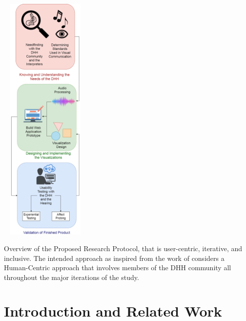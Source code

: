 \documentclass{sigchi-ext}
\begin{document}

\printccsdesc

\begin{marginfigure}[0pc]
\begin{minipage}{\marginparwidth}
     \centering
    \includegraphics[width=4.5cm,height=12.5cm]{figures/newSystemDesignFlowchart.png}
    \caption{Overview of the Proposed Research Protocol, that is user-centric, iterative, and inclusive. The intended approach as inspired from the work of \protect\cite{deja2019myosl} considers a Human-Centric approach that involves members of the DHH community all throughout the major iterations of the study.}
    \label{fig:methodology}
    \end{minipage}
\end{marginfigure}

\section{Introduction and Related Work}
\end{document}
